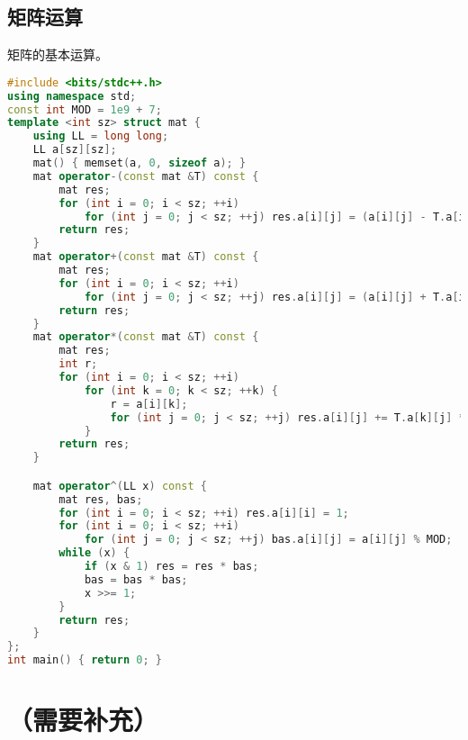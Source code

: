 \documentclass[9pt, a4paper, oneside]{book}
\begin{document}
\subsection{矩阵运算}
矩阵的基本运算。
\begin{lstlisting}[language={C++}]
#include <bits/stdc++.h>
using namespace std;
const int MOD = 1e9 + 7;
template <int sz> struct mat {
    using LL = long long;
    LL a[sz][sz];
    mat() { memset(a, 0, sizeof a); }
    mat operator-(const mat &T) const {
        mat res;
        for (int i = 0; i < sz; ++i)
            for (int j = 0; j < sz; ++j) res.a[i][j] = (a[i][j] - T.a[i][j]) % MOD;
        return res;
    }
    mat operator+(const mat &T) const {
        mat res;
        for (int i = 0; i < sz; ++i)
            for (int j = 0; j < sz; ++j) res.a[i][j] = (a[i][j] + T.a[i][j]) % MOD;
        return res;
    }
    mat operator*(const mat &T) const {
        mat res;
        int r;
        for (int i = 0; i < sz; ++i)
            for (int k = 0; k < sz; ++k) {
                r = a[i][k];
                for (int j = 0; j < sz; ++j) res.a[i][j] += T.a[k][j] * r, res.a[i][j] %= MOD;
            }
        return res;
    }

    mat operator^(LL x) const {
        mat res, bas;
        for (int i = 0; i < sz; ++i) res.a[i][i] = 1;
        for (int i = 0; i < sz; ++i)
            for (int j = 0; j < sz; ++j) bas.a[i][j] = a[i][j] % MOD;
        while (x) {
            if (x & 1) res = res * bas;
            bas = bas * bas;
            x >>= 1;
        }
        return res;
    }
};
int main() { return 0; }\end{lstlisting}
\section{（需要补充）}
\end{document}
